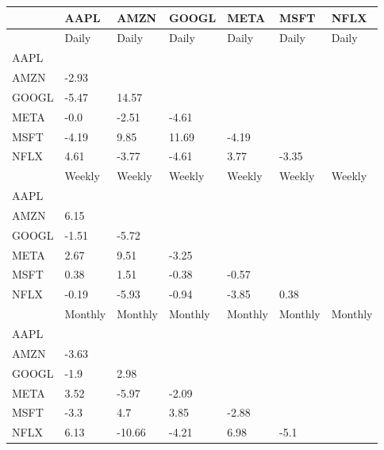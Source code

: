 \begin{tabular}{lllllll}
\toprule
{} &     AAPL &     AMZN &    GOOGL &     META &     MSFT &     NFLX \\
\midrule
      &    Daily &    Daily &    Daily &    Daily &    Daily &    Daily \\
AAPL  &          &          &          &          &          &          \\
AMZN  &    -2.93 &          &          &          &          &          \\
GOOGL &    -5.47 &    14.57 &          &          &          &          \\
META  &     -0.0 &    -2.51 &    -4.61 &          &          &          \\
MSFT  &    -4.19 &     9.85 &    11.69 &    -4.19 &          &          \\
NFLX  &     4.61 &    -3.77 &    -4.61 &     3.77 &    -3.35 &          \\
      &   Weekly &   Weekly &   Weekly &   Weekly &   Weekly &   Weekly \\
AAPL  &          &          &          &          &          &          \\
AMZN  &     6.15 &          &          &          &          &          \\
GOOGL &    -1.51 &    -5.72 &          &          &          &          \\
META  &     2.67 &     9.51 &    -3.25 &          &          &          \\
MSFT  &     0.38 &     1.51 &    -0.38 &    -0.57 &          &          \\
NFLX  &    -0.19 &    -5.93 &    -0.94 &    -3.85 &     0.38 &          \\
      &  Monthly &  Monthly &  Monthly &  Monthly &  Monthly &  Monthly \\
AAPL  &          &          &          &          &          &          \\
AMZN  &    -3.63 &          &          &          &          &          \\
GOOGL &     -1.9 &     2.98 &          &          &          &          \\
META  &     3.52 &    -5.97 &    -2.09 &          &          &          \\
MSFT  &     -3.3 &      4.7 &     3.85 &    -2.88 &          &          \\
NFLX  &     6.13 &   -10.66 &    -4.21 &     6.98 &     -5.1 &          \\
\bottomrule
\end{tabular}
